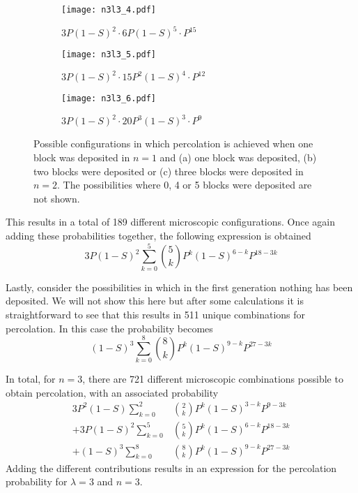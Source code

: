 \documentclass[amsmath,amssymb,amsfonts,aps,pre,preprint,superscriptaddress,bibnotes,showpacs,showkeys,longbibliography,nofootinbib]{revtex4-1}
\begin{document}
\begin{figure}[ht]
    \centering
    \begin{subfigure}{.32\textwidth}
      \centering
      \texttt{[image: n3l3\_4.pdf]}
      \caption{$3P (1-S)^2\cdot6P (1-S)^5\cdot P^{15}$}
      \label{fig:sub7}
    \end{subfigure}%
    \begin{subfigure}{.32\textwidth}
      \centering
      \texttt{[image: n3l3\_5.pdf]}
      \caption{$3P(1-S)^2\cdot 15P^2(1-S)^4\cdot P^{12}$}
      \label{fig:sub8}
    \end{subfigure}
    \begin{subfigure}{.32\textwidth}
      \centering
      \texttt{[image: n3l3\_6.pdf]}
      \caption{$3P(1-S)^2\cdot 20P^3(1-S)^3\cdot P^{9}$}
      \label{fig:sub9}
    \end{subfigure}
    \caption{Possible configurations in which percolation is achieved when one block was deposited in $n=1$ and (a) one block was deposited, (b) two blocks were deposited or (c) three blocks were deposited in $n=2$. The possibilities where 0, 4 or 5 blocks were deposited are not shown.}
    \label{fig:test3}
\end{figure}
This results in a total of 189 different microscopic configurations. Once again adding these probabilities together, the following expression is obtained
\begin{equation}
    3P(1-S)^2 \sum\limits_{k=0}^5{5\choose k} P^k (1-S)^{6-k}P^{18-3k}
\end{equation}

Lastly, consider the possibilities in which in the first generation nothing has been deposited. We will not show this here but after some calculations it is straightforward to see that this results in 511 unique combinations for percolation. In this case the probability becomes
\begin{equation}
    (1-S)^3 \sum\limits_{k=0}^8{8\choose k} P^k (1-S)^{9-k}P^{27-3k}
\end{equation}

In total, for $n=3$, there are 721 different microscopic combinations possible to obtain percolation, with an associated probability
\begin{equation}
    \label{eq:third_gen}
\begin{split}
    3 P^2 (1-S) \sum\limits_{k=0}^2 & {2\choose k}P^k (1-S)^{3-k}P^{9-3k}\\
    + 3P(1-S)^2 \sum\limits_{k=0}^5 & {5\choose k} P^k (1-S)^{6-k}P^{18-3k}\\ 
    + (1-S)^3 \sum\limits_{k=0}^8 & {8\choose k} P^k (1-S)^{9-k}P^{27-3k}
\end{split}
\end{equation}
Adding the different contributions results in an expression for the percolation probability for $\lambda = 3$ and $n=3$.


\end{document}
